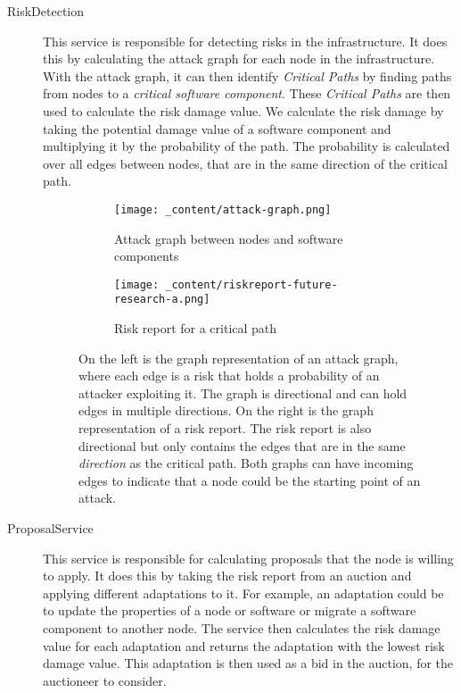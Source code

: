 \begin{description}
    \item[RiskDetection] This service is responsible for detecting risks in the infrastructure. It does this by calculating the attack graph for each node in the infrastructure. With the attack graph, it can then identify \textit{Critical Paths} by finding paths from nodes to a \textit{critical software component}. These \textit{Critical Paths} are then used to calculate the risk damage value. We calculate the risk damage by taking the potential damage value of a software component and multiplying it by the probability of the path. The probability is calculated over all edges between nodes, that are in the same direction of the critical path. 
    \begin{figure}[H]
        \centering
        \begin{subfigure}[b]{0.4\textwidth}
            \centering
            \texttt{[image: \_content/attack-graph.png]}
            \caption{Attack graph between nodes and software components}
            \label{fig:attack-graph}
        \end{subfigure}
        \hspace{0.5cm}
        \centering
        \begin{subfigure}[b]{0.4\textwidth}
            \centering
            \texttt{[image: \_content/riskreport-future-research-a.png]}
            \caption{Risk report for a critical path}
            \label{fig:risk-report}
        \end{subfigure}
        \caption{On the left is the graph representation of an attack graph, where each edge is a risk that holds a probability of an attacker exploiting it. The graph is directional and can hold edges in multiple directions. On the right is the graph representation of a risk report. The risk report is also directional but only contains the edges that are in the same \textit{direction} as the critical path. Both graphs can have incoming edges to indicate that a node could be the starting point of an attack.}
    \end{figure}

    \item[ProposalService] This service is responsible for calculating proposals that the node is willing to apply. It does this by taking the risk report from an auction and applying different adaptations to it. For example, an adaptation could be to update the properties of a node or software or migrate a software component to another node. The service then calculates the risk damage value for each adaptation and returns the adaptation with the lowest risk damage value. This adaptation is then used as a bid in the auction, for the auctioneer to consider. 
    

\end{description}
